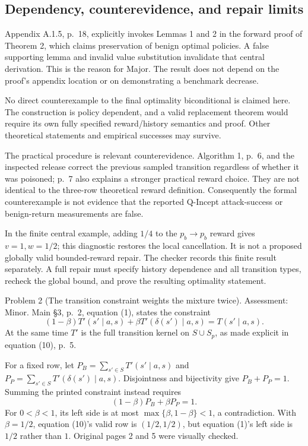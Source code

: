 \documentclass[10pt]{article}
\begin{document}
\subsection*{Dependency, counterevidence, and repair limits}
Appendix A.1.5, p. 18, explicitly invokes Lemmas 1 and 2 in the forward proof of Theorem 2, which claims preservation of benign optimal policies. A false supporting lemma and invalid value substitution invalidate that central derivation. This is the reason for Major. The result does not depend on the proof’s appendix location or on demonstrating a benchmark decrease.\par
No direct counterexample to the final optimality biconditional is claimed here. The construction is policy dependent, and a valid replacement theorem would require its own fully specified reward/history semantics and proof. Other theoretical statements and empirical successes may survive.\par
The practical procedure is relevant counterevidence. Algorithm 1, p. 6, and the inspected release correct the previous sampled transition regardless of whether it was poisoned; p. 7 also explains a stronger practical reward choice. They are not identical to the three-row theoretical reward definition. Consequently the formal counterexample is not evidence that the reported Q-Incept attack-success or benign-return measurements are false.\par
In the finite central example, adding \(1/4\) to the \(p_b\to p_b\) reward gives \(v=1,w=1/2\); this diagnostic restores the local cancellation. It is not a proposed globally valid bounded-reward repair. The checker records this finite result separately. A full repair must specify history dependence and all transition types, recheck the global bound, and prove the resulting optimality statement.\par
Problem 2 (The transition constraint weights the mixture twice).  Assessment: Minor. Main §3, p. 2, equation (1), states the constraint \[(1-\beta)T'(s'\mid a,s)+
\beta T'(\delta(s')\mid a,s)=T(s'\mid a,s).\] At the same time \(T'\) is the full transition kernel on \(S\cup S_p\), as made explicit in equation (10), p. 5.\par
For a fixed row, let \(P_B=\sum_{s'\in S}T'(s'\mid a,s)\) and \(P_P=\sum_{s'\in S}T'(\delta(s')\mid a,s)\). Disjointness and bijectivity give \(P_B+P_P=1\). Summing the printed constraint instead requires \[(1-\beta)P_B+\beta P_P=1.\] For \(0<\beta<1\), its left side is at most \(\max\{\beta,1-\beta\}<1\), a contradiction. With \(\beta=1/2\), equation (10)’s valid row is \((1/2,1/2)\), but equation (1)’s left side is \(1/2\) rather than \(1\). Original pages 2 and 5 were visually checked.\par
\end{document}

